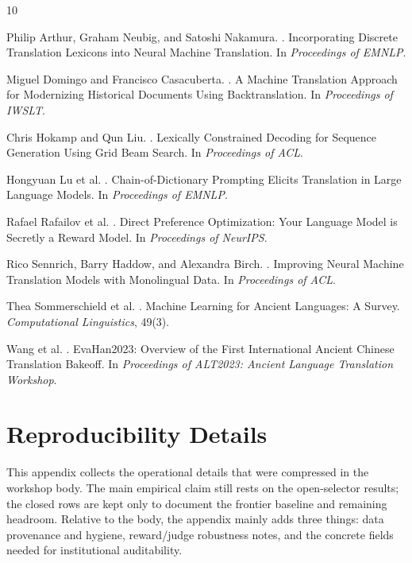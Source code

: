 \documentclass{article}
\begin{document}
\begin{thebibliography}{10}
\small

Philip Arthur, Graham Neubig, and Satoshi Nakamura.
.
\newblock Incorporating Discrete Translation Lexicons into Neural Machine Translation.
\newblock In \emph{Proceedings of EMNLP}.

Miguel Domingo and Francisco Casacuberta.
.
\newblock A Machine Translation Approach for Modernizing Historical Documents Using Backtranslation.
\newblock In \emph{Proceedings of IWSLT}.

Chris Hokamp and Qun Liu.
.
\newblock Lexically Constrained Decoding for Sequence Generation Using Grid Beam Search.
\newblock In \emph{Proceedings of ACL}.

Hongyuan Lu et al.
.
\newblock Chain-of-Dictionary Prompting Elicits Translation in Large Language Models.
\newblock In \emph{Proceedings of EMNLP}.

Rafael Rafailov et al.
.
\newblock Direct Preference Optimization: Your Language Model is Secretly a Reward Model.
\newblock In \emph{Proceedings of NeurIPS}.

Rico Sennrich, Barry Haddow, and Alexandra Birch.
.
\newblock Improving Neural Machine Translation Models with Monolingual Data.
\newblock In \emph{Proceedings of ACL}.

Thea Sommerschield et al.
.
\newblock Machine Learning for Ancient Languages: A Survey.
\newblock \emph{Computational Linguistics}, 49(3).

Wang et al.
.
\newblock EvaHan2023: Overview of the First International Ancient Chinese Translation Bakeoff.
\newblock In \emph{Proceedings of ALT2023: Ancient Language Translation Workshop}.

\end{thebibliography}

\clearpage
\appendix
\onecolumn

\section{Reproducibility Details}

This appendix collects the operational details that were compressed in the workshop body. The main empirical claim still rests on the open-selector results; the closed rows are kept only to document the frontier baseline and remaining headroom. Relative to the body, the appendix mainly adds three things: data provenance and hygiene, reward/judge robustness notes, and the concrete fields needed for institutional auditability.
\end{document}
